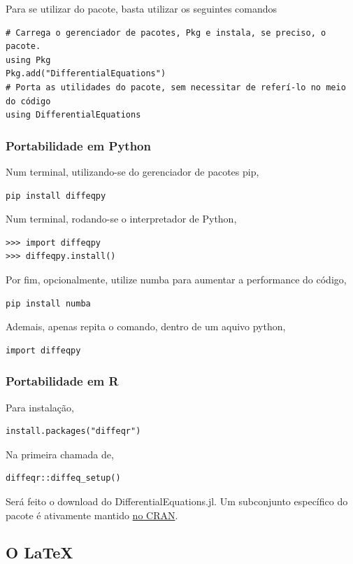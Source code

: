 \documentclass[
12pt,				%
openright,			%
oneside,			%
a4paper,			%
english,			%
french,				%
spanish,			%
brazil,				%
]{abntex2}
\begin{document}
Para se utilizar do pacote, basta utilizar os seguintes comandos

\begin{verbatim}
# Carrega o gerenciador de pacotes, Pkg e instala, se preciso, o pacote.
using Pkg
Pkg.add("DifferentialEquations")
# Porta as utilidades do pacote, sem necessitar de referí-lo no meio do código
using DifferentialEquations
\end{verbatim}

\subsubsection{Portabilidade em Python}

Num terminal, utilizando-se do gerenciador de pacotes pip,
\begin{verbatim}
pip install diffeqpy
\end{verbatim}

Num terminal, rodando-se o interpretador de Python,
\begin{verbatim}
>>> import diffeqpy
>>> diffeqpy.install()
\end{verbatim}

Por fim, opcionalmente, utilize numba para aumentar a performance do código,
\begin{verbatim}
pip install numba
\end{verbatim}

Ademais, apenas repita o comando, dentro de um aquivo python,

\begin{verbatim}
import diffeqpy
\end{verbatim}

\subsubsection{Portabilidade em R}

Para instalação,
\begin{verbatim}
install.packages("diffeqr")
\end{verbatim}

Na primeira chamada de,
\begin{verbatim}
diffeqr::diffeq_setup()
\end{verbatim}

Será feito o download do DifferentialEquations.jl. Um subconjunto específico do pacote é ativamente mantido \href{https://cran.r-project.org/web/packages/diffeqr/index.html}{no CRAN}.

\subsection{O \LaTeX}
\end{document}
